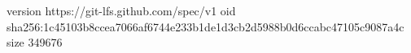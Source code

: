 version https://git-lfs.github.com/spec/v1
oid sha256:1c45103b8ccea7066af6744e233b1de1d3cb2d5988b0d6ccabc47105c9087a4c
size 349676
